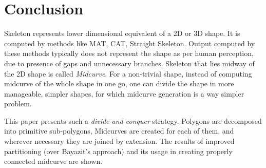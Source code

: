 \section{Conclusion}

Skeleton represents lower dimensional equivalent of a 2D or 3D shape. It is computed by methods like MAT, CAT, Straight Skeleton. Output computed by these methods typically does not represent the shape as per human perception, due to presence of gaps and unnecessary branches. Skeleton that lies midway of the 2D shape is called {\em Midcurve}. For a non-trivial shape, instead of computing midcurve of the whole shape in one go, one can divide the shape in more manageable, simpler shapes, for which midcurve generation is a way simpler problem. 

This paper presents such a {\em divide-and-conquer} strategy. Polygons are decomposed into primitive sub-polygons, Midcurves are created for each of them, and wherever necessary they are joined by extension.  The results of improved partitioning (over Bayazit's \citep{Bayazit} approach) and its usage in creating properly connected midcurve are shown.
